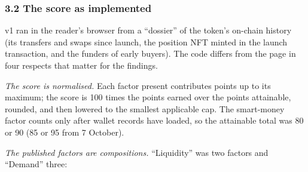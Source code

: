 \subsubsection{3.2 The score as implemented}\label{the-score-as-implemented}

v1 ran in the reader's browser from a ``dossier'' of the token's on-chain history (its transfers and swaps since launch, the position NFT minted in the launch transaction, and the funders of early buyers). The code differs from the page in four respects that matter for the findings.

\emph{The score is normalised.} Each factor present contributes points up to its maximum; the score is 100 times the points earned over the points attainable, rounded, and then lowered to the smallest applicable cap. The smart-money factor counts only after wallet records have loaded, so the attainable total was 80 or 90 (85 or 95 from 7 October).

\emph{The published factors are compositions.} ``Liquidity'' was two factors and ``Demand'' three:

